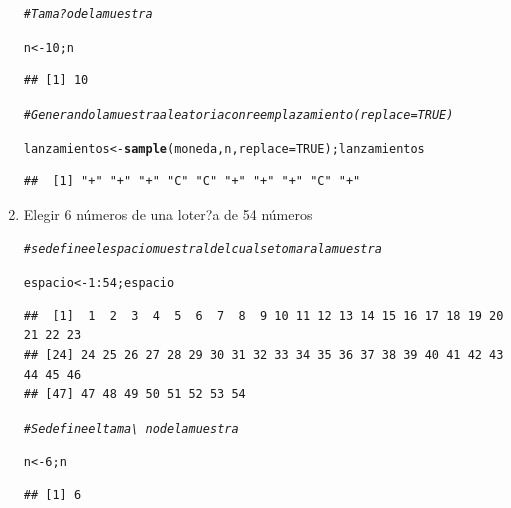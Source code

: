 \documentclass[12pt,letterpaper]{article}\usepackage[]{graphicx}\usepackage[]{color}
\makeatletter
\newcommand{\hlnum}[1]{\textcolor[rgb]{0.686,0.059,0.569}{#1}}%
\newcommand{\hlcom}[1]{\textcolor[rgb]{0.678,0.584,0.686}{\textit{#1}}}%
\newcommand{\hlopt}[1]{\textcolor[rgb]{0,0,0}{#1}}%
\newcommand{\hlstd}[1]{\textcolor[rgb]{0.345,0.345,0.345}{#1}}%
\newcommand{\hlkwb}[1]{\textcolor[rgb]{0.69,0.353,0.396}{#1}}%
\newcommand{\hlkwc}[1]{\textcolor[rgb]{0.333,0.667,0.333}{#1}}%
\newcommand{\hlkwd}[1]{\textcolor[rgb]{0.737,0.353,0.396}{\textbf{#1}}}%
\newenvironment{kframe}{%
 \def\at@end@of@kframe{}%
 \ifinner\ifhmode%
  \def\at@end@of@kframe{\end{minipage}}%
  \begin{minipage}{\columnwidth}%
 \fi\fi%
 \def\FrameCommand##1{\hskip\@totalleftmargin \hskip-\fboxsep
 \colorbox{shadecolor}{##1}\hskip-\fboxsep
     \hskip-\linewidth \hskip-\@totalleftmargin \hskip\columnwidth}%
 \MakeFramed {\advance\hsize-\width
   \@totalleftmargin\z@ \linewidth\hsize
   \@setminipage}}%
 {\par\unskip\endMakeFramed%
 \at@end@of@kframe}
\newenvironment{knitrout}{}{} %
\makeatother
\begin{document}
\begin{enumerate}
\begin{knitrout}
\color{fgcolor}\begin{kframe}
\begin{alltt}
\hlcom{# Tama?o de la muestra }

\hlstd{n} \hlkwb{<-} \hlnum{10}\hlstd{; n}
\end{alltt}
\begin{verbatim}
## [1] 10
\end{verbatim}
\end{kframe}
\end{knitrout}

\begin{knitrout}
\color{fgcolor}\begin{kframe}
\begin{alltt}
\hlcom{# Generando la muestra aleatoria con reemplazamiento (replace=TRUE)}

\hlstd{lanzamientos} \hlkwb{<-} \hlkwd{sample}\hlstd{(moneda, n,} \hlkwc{replace}\hlstd{=}\hlnum{TRUE}\hlstd{); lanzamientos}
\end{alltt}
\begin{verbatim}
##  [1] "+" "+" "+" "C" "C" "+" "+" "+" "C" "+"
\end{verbatim}
\end{kframe}
\end{knitrout}

\item Elegir 6 n\'umeros de una loter?a de 54 n\'umeros 

\begin{knitrout}
\color{fgcolor}\begin{kframe}
\begin{alltt}
\hlcom{# se define el espacio muestral del cual se tomara la muestra}

\hlstd{espacio} \hlkwb{<-} \hlnum{1}\hlopt{:}\hlnum{54}\hlstd{;espacio}
\end{alltt}
\begin{verbatim}
##  [1]  1  2  3  4  5  6  7  8  9 10 11 12 13 14 15 16 17 18 19 20 21 22 23
## [24] 24 25 26 27 28 29 30 31 32 33 34 35 36 37 38 39 40 41 42 43 44 45 46
## [47] 47 48 49 50 51 52 53 54
\end{verbatim}
\begin{alltt}
\hlcom{# Se define el tama\textbackslash{}~no de la muestra}

\hlstd{n} \hlkwb{<-} \hlnum{6}\hlstd{; n}
\end{alltt}
\begin{verbatim}
## [1] 6
\end{verbatim}
\end{kframe}
\end{knitrout}


\end{enumerate}
\end{document}
